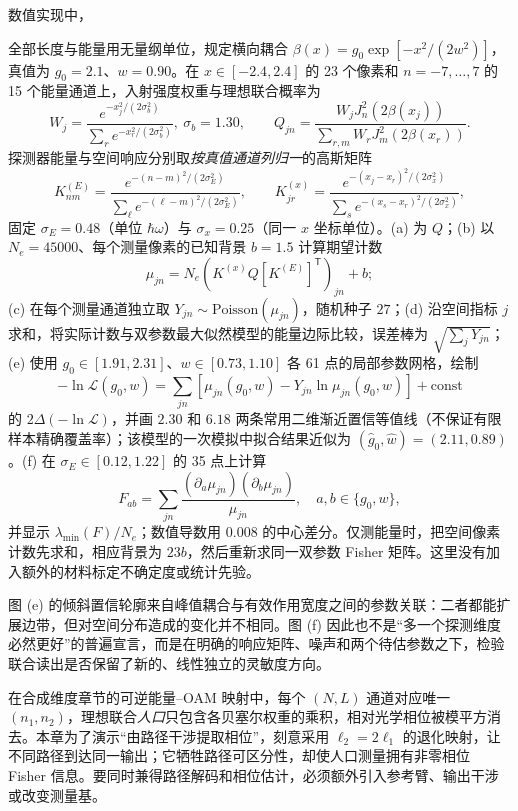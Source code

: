 数值实现中，\par\smallskip
全部长度与能量用无量纲单位，规定横向耦合 $\beta(x)=g_0\exp[-x^2/(2w^2)]$，真值为 $g_0=2.1$、$w=0.90$。在 $x\in[-2.4,2.4]$ 的 23 个像素和 $n=-7,\ldots,7$ 的 15 个能量通道上，入射强度权重与理想联合概率为
\[
W_j=\frac{e^{-x_j^2/(2\sigma_b^2)}}{\sum_r e^{-x_r^2/(2\sigma_b^2)}},\ \sigma_b=1.30,\qquad
Q_{jn}=\frac{W_jJ_n^2(2\beta(x_j))}{\sum_{r,m}W_rJ_m^2(2\beta(x_r))}.
\]
探测器能量与空间响应分别取\emph{按真值通道列归一}的高斯矩阵
\[
K^{(E)}_{nm}=\frac{e^{-(n-m)^2/(2\sigma_E^2)}}{\sum_\ell e^{-(\ell-m)^2/(2\sigma_E^2)}},\qquad
K^{(x)}_{jr}=\frac{e^{-(x_j-x_r)^2/(2\sigma_x^2)}}{\sum_s e^{-(x_s-x_r)^2/(2\sigma_x^2)}},
\]
固定 $\sigma_E=0.48$（单位 $\hbar\omega$）与 $\sigma_x=0.25$（同一 $x$ 坐标单位）。(a) 为 $Q$；(b) 以 $N_e=45000$、每个测量像素的已知背景 $b=1.5$ 计算期望计数
\[
\mu_{jn}=N_e(K^{(x)}Q[K^{(E)}]^\mathsf T)_{jn}+b;
\]
(c) 在每个测量通道独立取 $Y_{jn}\sim\mathrm{Poisson}(\mu_{jn})$，随机种子 $27$；(d) 沿空间指标 $j$ 求和，将实际计数与双参数最大似然模型的能量边际比较，误差棒为 $\sqrt{\sum_jY_{jn}}$；(e) 使用 $g_0\in[1.91,2.31]$、$w\in[0.73,1.10]$ 各 61 点的局部参数网格，绘制
\[
-\ln\mathcal L(g_0,w)=\sum_{jn}[\mu_{jn}(g_0,w)-Y_{jn}\ln\mu_{jn}(g_0,w)]+\mathrm{const}
\]
的 $2\Delta(-\ln\mathcal L)$，并画 $2.30$ 和 $6.18$ 两条常用二维渐近置信等值线（不保证有限样本精确覆盖率）；该模型的一次模拟中拟合结果近似为 $(\hat g_0,\hat w)=(2.11,0.89)$。(f) 在 $\sigma_E\in[0.12,1.22]$ 的 35 点上计算
\[
F_{ab}=\sum_{jn}\frac{(\partial_a\mu_{jn})(\partial_b\mu_{jn})}{\mu_{jn}},\quad a,b\in\{g_0,w\},
\]
并显示 $\lambda_{\min}(F)/N_e$；数值导数用 $0.008$ 的中心差分。仅测能量时，把空间像素计数先求和，相应背景为 $23b$，然后重新求同一双参数 Fisher 矩阵。这里没有加入额外的材料标定不确定度或统计先验。


图 (e) 的倾斜置信轮廓来自峰值耦合与有效作用宽度之间的参数关联：二者都能扩展边带，但对空间分布造成的变化并不相同。图 (f) 因此也不是“多一个探测维度必然更好”的普遍宣言，而是在明确的响应矩阵、噪声和两个待估参数之下，检验联合读出是否保留了新的、线性独立的灵敏度方向。

\clearpage
\par\medskip 在合成维度章节的可逆能量--OAM 映射中，每个 $ (N,L)$ 通道对应唯一 $(n_1,n_2)$，理想联合\emph{人口}只包含各贝塞尔权重的乘积，相对光学相位被模平方消去。本章为了演示“由路径干涉提取相位”，刻意采用 $\ell_2=2\ell_1$ 的退化映射，让不同路径到达同一输出；它牺牲路径可区分性，却使人口测量拥有非零相位 Fisher 信息。要同时兼得路径解码和相位估计，必须额外引入参考臂、输出干涉或改变测量基。


